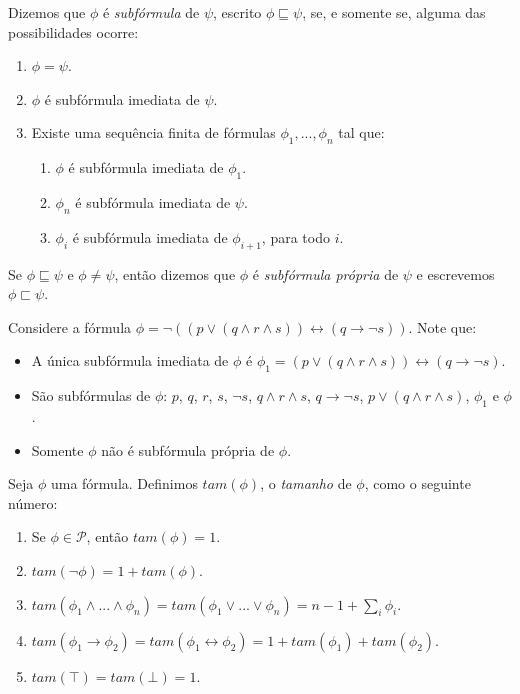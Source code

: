 \begin{definition}
    Dizemos que $\phi$ é \emph{subfórmula} de $\psi$, escrito $\phi \sqsubseteq \psi$, se, e somente se, alguma das possibilidades ocorre:
    \begin{enumerate}
    	\item $\phi = \psi$.
    	\item $\phi$ é subfórmula imediata de $\psi$.
    	\item Existe uma sequência finita de fórmulas $\phi_1,...,\phi_n$ tal que:
    	\begin{enumerate}
    		\item $\phi$ é subfórmula imediata de $\phi_1$.
    		\item $\phi_n$ é subfórmula imediata de $\psi$.
    		\item $\phi_i$ é subfórmula imediata de $\phi_{i+1}$, para todo $i$.
    	\end{enumerate}
    \end{enumerate}
    
    Se $\phi \sqsubseteq \psi$ e $\phi \neq \psi$, então dizemos que $\phi$ é \emph{subfórmula própria} de $\psi$ e escrevemos $\phi \sqsubset \psi$.
\end{definition}

\begin{example}
    Considere a fórmula $\phi = \neg((p \vee (q \wedge r \wedge s)) \leftrightarrow (q \rightarrow \neg s))$. Note que:
    \begin{itemize}
        \item A única subfórmula imediata de $\phi$ é $\phi_1 = (p \vee (q \wedge r \wedge s)) \leftrightarrow (q \rightarrow \neg s)$.
        \item São subfórmulas de $\phi$: $p$, $q$, $r$, $s$, $\neg s$, $q \wedge r \wedge s$, $q \rightarrow \neg s$, $p \vee (q \wedge r \wedge s)$, $\phi_1$ e $\phi$.
        \item Somente $\phi$ não é subfórmula própria de $\phi$.
    \end{itemize}
\end{example}

\begin{definition}
	Seja $\phi$ uma fórmula. Definimos $tam(\phi)$, o \emph{tamanho} de $\phi$, como o seguinte número:
	\begin{enumerate}
		\item Se $\phi \in \mathcal{P}$, então $tam(\phi) = 1$.
		\item $tam(\neg \phi) = 1 + tam(\phi)$.
		\item $tam(\phi_1 \wedge ... \wedge \phi_n) = tam(\phi_1 \vee ... \vee \phi_n) = n - 1 + \sum_i \phi_i$.
		\item $tam(\phi_1 \rightarrow \phi_2) = tam(\phi_1 \leftrightarrow \phi_2) = 1 + tam(\phi_1) + tam(\phi_2)$.
		\item $tam(\top) = tam(\bot) = 1$.
	\end{enumerate}
\end{definition}


